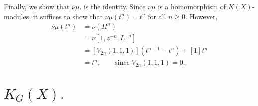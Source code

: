 Finally, we show that $\nu\mu$. is the identity. Since $\nu\mu$ is a homomorphism of $K(X)$-modules, it suffices to show that $\nu\mu(t^n) = t^n$ for all $n \geq 0$. However,
\begin{align*}
    \nu\mu(t^n) &= \nu(H^n) \\
    &= \nu[1, z^{-n}, L^{-n}] \\
    &= [V_{2n}(1, 1, 1)](t^{n-1} - t^n) + [1]t^n \\
    &= t^n, \qquad \text{since } V_{2n}(1, 1, 1) = 0 .
\end{align*}

\newpage


\section{$K_G(X).$}
